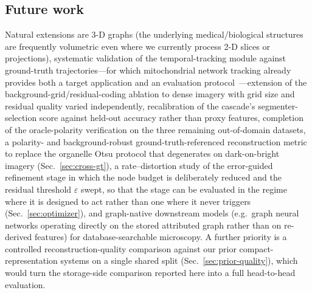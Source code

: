 \documentclass[10pt,a4paper]{article}
\begin{document}
\subsection{Future work}
Natural extensions are 3-D graphs (the underlying medical/biological
structures are frequently volumetric even where we currently process 2-D
slices or projections), systematic validation of the temporal-tracking module
against ground-truth trajectories---for which mitochondrial network tracking
already provides both a target application and an evaluation
protocol~\cite{wang2023mitotnt}---extension of the
background-grid/residual-coding ablation to dense imagery with grid size and
residual quality varied independently,
recalibration of the cascade's segmenter-selection score against
held-out accuracy rather than proxy features, completion of the
oracle-polarity verification on the three remaining out-of-domain datasets,
a polarity- and background-robust ground-truth-referenced reconstruction
metric to replace the organelle Otsu protocol that degenerates on
dark-on-bright imagery (Sec.~\ref{sec:cross-gt}),
a rate--distortion study of the error-guided refinement stage in which the
node budget is deliberately reduced and the residual threshold $\varepsilon$
swept, so that the stage can be evaluated in the regime where it is designed
to act rather than one where it never triggers (Sec.~\ref{sec:optimizer}),
and graph-native downstream models (e.g.\ graph neural networks operating
directly on the stored attributed graph rather than on re-derived features)
for database-searchable microscopy. A further priority is a controlled
reconstruction-quality comparison against our prior compact-representation
systems on a single shared split (Sec.~\ref{sec:prior-quality}), which would
turn the storage-side comparison reported here into a full head-to-head
evaluation.

\end{document}
